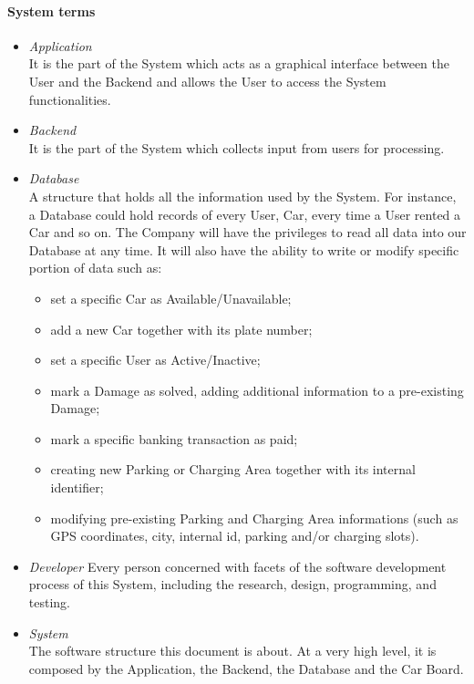 \paragraph{System terms}
\begin{itemize}
	\item \emph{Application} \\
	It is the part of the System which acts as a graphical interface between the User and the Backend and allows the User to access the System functionalities.

	\item \emph{Backend}\\
	It is the part of the System which collects input from users for processing.
		
	\item \emph{Database} \label{var:database}\\
	A structure that holds all the information used by the System. For instance, a Database could hold records of every User, Car, every time a User rented a Car and so on. 
	The Company will have the privileges to read all data into our Database at any time. It will also have the ability to write or modify specific portion of data such as:
	\begin{itemize}
		\item set a specific Car as Available/Unavailable;
		\item add a new Car together with its plate number;
		\item set a specific User as Active/Inactive;
		\item mark a Damage as solved, adding additional information to a pre-existing Damage;
		\item mark a specific banking transaction as paid;
		\item creating new Parking or Charging Area together with its internal identifier;
		\item modifying pre-existing Parking and Charging Area informations (such as GPS coordinates, city, internal id, parking and/or charging slots).
	\end{itemize}
	
	\item \emph{Developer}
	Every person concerned with facets of the software development process of this System, including the research, design, programming, and testing. 
	
	\item \emph{System}\\
	The software structure this document is about. At a very high level, it is composed by the Application, the Backend, the Database and the Car Board.
\end{itemize}

